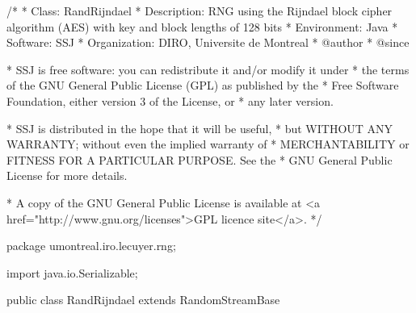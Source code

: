 \begin{code}
\begin{hide}
/*
 * Class:        RandRijndael
 * Description:  RNG using the Rijndael block cipher algorithm (AES) with
                 key and block lengths of 128 bits
 * Environment:  Java
 * Software:     SSJ
 * Organization: DIRO, Universite de Montreal
 * @author
 * @since

 * SSJ is free software: you can redistribute it and/or modify it under
 * the terms of the GNU General Public License (GPL) as published by the
 * Free Software Foundation, either version 3 of the License, or
 * any later version.

 * SSJ is distributed in the hope that it will be useful,
 * but WITHOUT ANY WARRANTY; without even the implied warranty of
 * MERCHANTABILITY or FITNESS FOR A PARTICULAR PURPOSE.  See the
 * GNU General Public License for more details.

 * A copy of the GNU General Public License is available at
   <a href="http://www.gnu.org/licenses">GPL licence site</a>.
 */
\end{hide}
package umontreal.iro.lecuyer.rng; \begin{hide}

import java.io.Serializable; \end{hide}

public class RandRijndael extends RandomStreamBase \begin{hide} {

   private static final long serialVersionUID = 70510L;
   //La date de modification a l'envers, lire 10/05/2007


   private static final int BLOCK_SIZE = 16;
   private static final int JUMP_STREAM = 10;
   private static final int JUMP_SUBSTREAM = 5;

   //actually a Object[] containing 2 int[][]
   private static Object key;

   private static byte[] curr_stream;
   private byte[] stream;
   private byte[] substream;

   private byte[] state;
   private byte[] output;
   private int outputPos;

   static
   {
      try {
         key = Rijndael_Algorithm.makeKey(new byte[]{1,2,3,4,5,6,7,8,
                                          9,10,11,12,13,14,15,16},
                                          BLOCK_SIZE);
      } catch(Exception e) {
         //pour que Java soit certain que la clef est initialisee
         key = new Object[0];
         e.printStackTrace();
         throw new RuntimeException("  cannot create RandRijndael key");
      }

      curr_stream = new byte[BLOCK_SIZE];
      for(int i = 0; i < BLOCK_SIZE; i++)
         curr_stream[i] = 0;
   }

   private static void iterate (byte[] b, int pos) {
      while((pos < b.length) && (++b[pos++] == 0));
   }

 \end{hide}
\end{code}

